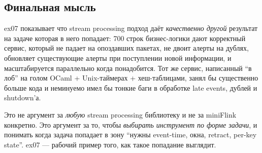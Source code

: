 \subsection{Финальная мысль}

ex07 показывает что stream processing подход даёт \emph{качественно
другой} результат на задаче которая в него попадает: 700 строк
бизнес-логики дают корректный сервис, который не падает на
опоздавших пакетах, не двоит алерты на дублях, обновляет
существующие алерты при поступлении новой информации, и
масштабируется параллельно когда понадобится. Тот же сервис, написанный
``в лоб'' на голом OCaml + Unix-таймерах + хеш-таблицами, занял бы
существенно больше кода и неминуемо имел бы тонкие баги в обработке
late events, дублей и shutdown'а.

Это не аргумент за \emph{любую} stream processing библиотеку и не
за miniFlink конкретно. Это аргумент за то, чтобы \emph{выбирать
инструмент по форме задачи}, и понимать когда задача попадает в зону
``нужны event-time, окна, retract, per-key state''. ex07 ---
рабочий пример того, как такое попадание выглядит.
